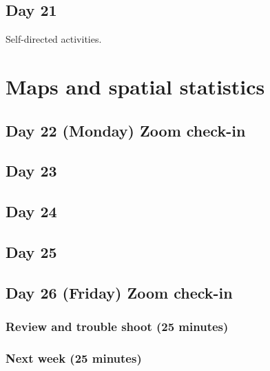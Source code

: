 \documentclass[]{book}
\begin{document}
\hypertarget{day-21}{%
\section{Day 21}\label{day-21}}

Self-directed activities.

\hypertarget{four}{%
\chapter{Maps and spatial statistics}\label{four}}

\hypertarget{day-22-monday-zoom-check-in}{%
\section{Day 22 (Monday) Zoom check-in}\label{day-22-monday-zoom-check-in}}

\hypertarget{day-23}{%
\section{Day 23}\label{day-23}}

\hypertarget{day-24}{%
\section{Day 24}\label{day-24}}

\hypertarget{day-25}{%
\section{Day 25}\label{day-25}}

\hypertarget{day-26-friday-zoom-check-in}{%
\section{Day 26 (Friday) Zoom check-in}\label{day-26-friday-zoom-check-in}}

\hypertarget{review-and-trouble-shoot-25-minutes-1}{%
\subsection{Review and trouble shoot (25 minutes)}\label{review-and-trouble-shoot-25-minutes-1}}

\hypertarget{next-week-25-minutes-1}{%
\subsection{Next week (25 minutes)}\label{next-week-25-minutes-1}}
\end{document}
